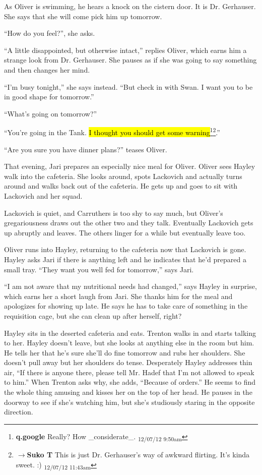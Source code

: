 As Oliver is swimming, he hears a knock on the cistern door.  It is Dr. Gerhauser.  She says that she will come pick him up tomorrow.  

``How do you feel?'', she asks.

``A little disappointed, but otherwise intact,'' replies Oliver, which earns him a strange look from Dr. Gerhauser.   She pauses as if she was going to say something and then changes her mind.

``I'm busy tonight,'' she says instead. ``But check in with Swan.  I want you to be in good shape for tomorrow.''

``What's going on tomorrow?''

``You're going in the Tank.  \hl{I thought you should get some warning}\footnote{\textbf{q.google }Really?  How \_considerate\_. \textsubscript{12/07/12 9:50am}}\footnote{$\rightarrow$\textbf{Suko T }This is just Dr. Gerhauser's way of awkward flirting.  It's kinda sweet. :) \textsubscript{12/07/12 11:43am}}.''

``Are you sure you have dinner plans?'' teases Oliver.



That evening, Jari prepares an especially nice meal for Oliver.  Oliver sees Hayley walk into the cafeteria.  She looks around, spots Lackovich and actually turns around and walks back out of the cafeteria.  He gets up and goes to sit with Lackovich and her squad. 



Lackovich is quiet, and Carruthers is too shy to say much, but Oliver's gregariousness draws out the other two and they talk.  Eventually Lackovich gets up abruptly and leaves.  The others linger for a while but eventually leave too.



Oliver runs into Hayley, returning to the cafeteria now that Lackovich is gone.  Hayley asks Jari if there is anything left and he indicates that he'd prepared a small tray.  ``They want you well fed for tomorrow,'' says Jari.

``I am not aware that my nutritional needs had changed,'' says Hayley in surprise, which earns her a short laugh from Jari.  She thanks him for the meal and apologizes for showing up late. He says he has to take care of something in the requisition cage, but she can clean up after herself, right?



Hayley sits in the deserted cafeteria and eats.  Trenton walks in and starts talking to her.  Hayley doesn't leave, but she looks at anything else in the room but him.  He tells her that he's sure she'll do fine tomorrow and rubs her shoulders.  She doesn't pull away but her shoulders do tense.  Desperately Hayley addresses thin air, ``If there is anyone there, please tell Mr. Hadef that I'm not allowed to speak to him.''  When Trenton asks why, she adds, ``Because of orders.'' He seems to find the whole thing amusing and kisses her on the top of her head.  He pauses in the doorway to see if she's watching him, but she's studiously staring in the opposite direction.



